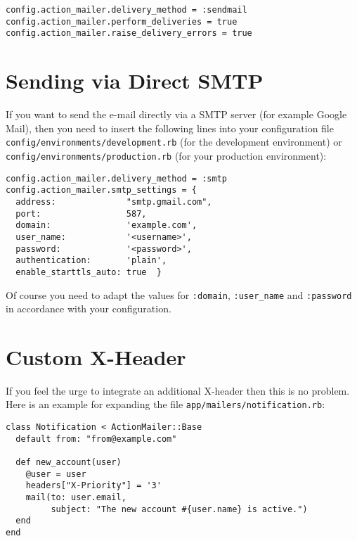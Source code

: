 \documentclass[a4paper]{book}
\begin{document}
\begin{shaded}\begin{verbatim}
config.action_mailer.delivery_method = :sendmail
config.action_mailer.perform_deliveries = true
config.action_mailer.raise_delivery_errors = true
\end{verbatim}\end{shaded}

\section{Sending via Direct SMTP}\label{sending-via-direct-smtp}

If you want to send the e-mail directly via a SMTP server (for example Google Mail), then you need to insert the following lines into your configuration file \texttt{config/environments/development.rb} (for the development environment) or \texttt{config/environments/production.rb} (for your production environment):

\begin{shaded}\begin{verbatim}
config.action_mailer.delivery_method = :smtp
config.action_mailer.smtp_settings = {
  address:              "smtp.gmail.com",
  port:                 587,
  domain:               'example.com',
  user_name:            '<username>',
  password:             '<password>',
  authentication:       'plain',
  enable_starttls_auto: true  }
\end{verbatim}\end{shaded}

Of course you need to adapt the values for \texttt{:domain}, \texttt{:user\_name} and \texttt{:password} in accordance with your configuration.

\section{Custom X-Header}\label{custom-x-header}

If you feel the urge to integrate an additional X-header then this is no problem. Here is an example for expanding the file \texttt{app/mailers/notification.rb}:

\begin{shaded}\begin{verbatim}
class Notification < ActionMailer::Base
  default from: "from@example.com"

  def new_account(user)
    @user = user
    headers["X-Priority"] = '3'
    mail(to: user.email,
         subject: "The new account #{user.name} is active.")
  end
end
\end{verbatim}\end{shaded}
\end{document}
